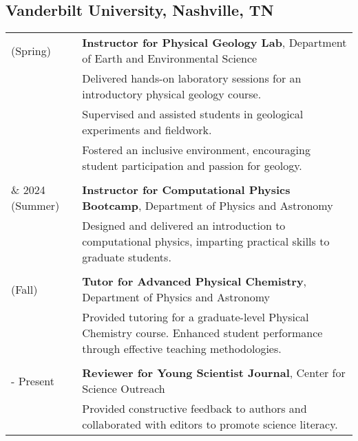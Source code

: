 \documentclass[a4paper,10pt]{article}
\begin{document}
\subsection*{Vanderbilt University, Nashville, TN}
\begin{tabularx}{\textwidth}{>{\raggedright\arraybackslash}p{2.5cm} X}
2024 (Spring) & \textbf{Instructor for Physical Geology Lab}, Department of Earth and Environmental Science \\
              & Delivered hands-on laboratory sessions for an introductory physical geology course. \\
              & Supervised and assisted students in geological experiments and fieldwork. \\
              & Fostered an inclusive environment, encouraging student participation and passion for geology. \\\\

2023 \& 2024 (Summer) & \textbf{Instructor for Computational Physics Bootcamp}, Department of Physics and Astronomy \\
                      & Designed and delivered an introduction to computational physics, imparting practical skills to graduate students. \\\\

2023 (Fall) & \textbf{Tutor for Advanced Physical Chemistry}, Department of Physics and Astronomy \\
            & Provided tutoring for a graduate-level Physical Chemistry course. Enhanced student performance through effective teaching methodologies. \\\\

2023 - Present & \textbf{Reviewer for Young Scientist Journal}, Center for Science Outreach \\
               & Provided constructive feedback to authors and collaborated with editors to promote science literacy.
\end{tabularx}
\end{document}
